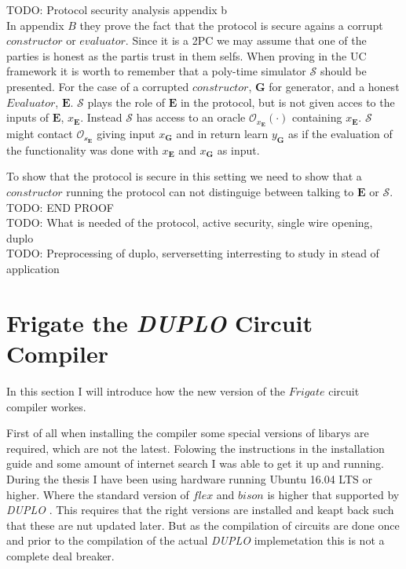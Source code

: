 \documentclass[twoside,11pt,openright]{report}
\newcommand{\todo}[1]{}
\renewcommand{\todo}[1]{{\color{red} TODO: {#1}} \\}
\newcommand{\DUPLO}{\textit{DUPLO} }
\begin{document}
\todo{Protocol security analysis appendix b}
In appendix $B$ they prove the fact that the protocol is secure agains a corrupt $constructor$ or $evaluator$. Since it is a 2PC we may assume that one of the parties is honest as the partis trust in them selfs. When proving in the UC framework it is worth to remember that a poly-time simulator $\mathcal{S}$ should be presented. For the case of a corrupted $constructor$, $\mathbf{G}$ for generator, and a honest $Evaluator$, $\mathbf{E}$. $\mathcal{S}$ plays the role of $\mathbf{E}$ in the protocol, but is not given acces to the inputs of $\mathbf{E}$, $x_{\mathbf{E}}$. Instead $\mathcal{S}$ has access to an oracle $\mathcal{O}_{x_{\mathbf{E}}}(\cdot)$ containing $x_{\mathbf{E}}$. $\mathcal{S}$ might contact $\mathcal{O_{x_{\mathbf{E}}}}$ giving input $x_{\mathbf{G}}$ and in return learn $y_{\mathbf{G}}$ as if the evaluation of the functionality was done with $x_{\mathbf{E}}$ and $x_{\mathbf{G}}$ as input.

To show that the protocol is secure in this setting we need to show that a $constructor$ running the protocol can not distinguige between talking to $\mathbf{E}$ or $\mathcal{S}$. \todo{END PROOF}

\todo{What is needed of the protocol, active security, single wire opening, duplo}

\todo{Preprocessing of duplo, serversetting interresting to study in stead of application}

\section{Frigate the \DUPLO Circuit Compiler}
\label{sec:frigate}
In this section I will introduce how the new version of the $Frigate$ circuit compiler workes.

First of all when installing the compiler some special versions of libarys are required, which are not the latest. Folowing the instructions in the installation guide and some amount of internet search I was able to get it up and running. During the thesis I have been using hardware running Ubuntu 16.04 LTS or higher. Where the standard version of $flex$ and $bison$ is higher that supported by \DUPLO. This requires that the right versions are installed and keapt back such that these are nut updated later. But as the compilation of circuits are done once and prior to the compilation of the actual \DUPLO implemetation this is not a complete deal breaker.
\end{document}
